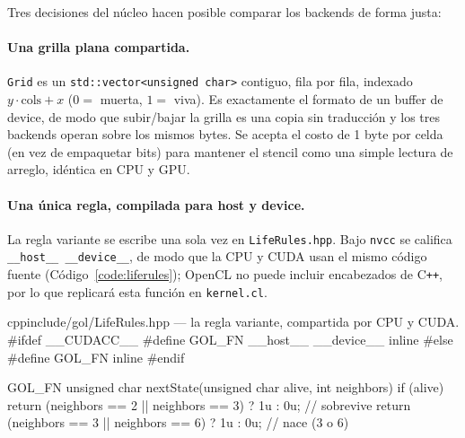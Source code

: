 \documentclass[
	spanish,
	letterpaper, oneside
]{article}
\begin{document}

Tres decisiones del núcleo hacen posible comparar los backends de forma justa:

\paragraph{Una grilla plana compartida.} \texttt{Grid} es un
\texttt{std::vector<unsigned char>} contiguo, fila por fila, indexado
$y\cdot\text{cols}+x$ ($0=$ muerta, $1=$ viva). Es exactamente el formato de un
buffer de device, de modo que subir/bajar la grilla es una copia sin
traducción y los tres backends operan sobre los mismos bytes. Se acepta el costo
de 1 byte por celda (en vez de empaquetar bits) para mantener el stencil
como una simple lectura de arreglo, idéntica en CPU y GPU.

\paragraph{Una única regla, compilada para host y device.} La regla
variante se escribe una sola vez en \texttt{LifeRules.hpp}. Bajo \texttt{nvcc} se
califica \texttt{\_\_host\_\_ \_\_device\_\_}, de modo que la CPU y CUDA usan el
mismo código fuente (Código~\ref{code:liferules}); OpenCL no puede incluir
encabezados de C\texttt{++}, por lo que replicará esta función en
\texttt{kernel.cl}.

\begin{sourcecode}[\label{code:liferules}]{cpp}{include/gol/LifeRules.hpp --- la regla variante, compartida por CPU y CUDA.}
#ifdef __CUDACC__
#define GOL_FN __host__ __device__ inline
#else
#define GOL_FN inline
#endif

GOL_FN unsigned char nextState(unsigned char alive, int neighbors) {
  if (alive)
    return (neighbors == 2 || neighbors == 3) ? 1u : 0u; // sobrevive
  return (neighbors == 3 || neighbors == 6) ? 1u : 0u;   // nace (3 o 6)
}
\end{sourcecode}
\end{document}
